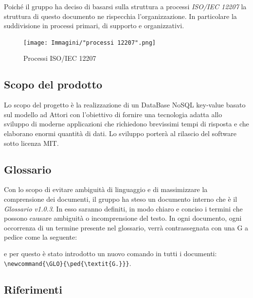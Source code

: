 \documentclass[a4paper]{article}
\begin{document}
			Poiché il gruppo ha deciso di basarsi sulla struttura a processi \emph{ISO/IEC 12207}
			la struttura di questo documento ne rispecchia
			l'organizzazione. In particolare la suddivisione in processi primari, di supporto e organizzativi.
			\begin{figure}[H]
				\centering
				\texttt{[image: Immagini/"processi 12207".png]}
				\caption{Processi ISO/IEC 12207}
			\end{figure}
		\subsection{Scopo del prodotto}
			Lo scopo del progetto è la realizzazione di un DataBase NoSQL key-value basato sul modello ad
			Attori con l'obiettivo di fornire una tecnologia adatta allo sviluppo di moderne
			applicazioni che richiedono brevissimi tempi di risposta e che elaborano enormi quantità
			di dati. Lo sviluppo porterà al rilascio del software sotto licenza MIT.
		\subsection{Glossario}
			Con lo scopo di evitare ambiguità di linguaggio e di massimizzare la comprensione dei documenti, il
	      	gruppo ha steso un documento interno che è il \emph{Glossario v1.0.3}. In esso saranno definiti, in modo
	      	chiaro e conciso i termini che possono causare ambiguità o incomprensione del testo. In ogni documento,
	      	ogni occorrenza di un termine presente nel glossario, verrà contrassegnata con una G a pedice come la seguente:
	      	\newline
	      	\begin{center}
	      	\end{center}
	      	e per questo è stato introdotto un nuovo comando in tutti i documenti: \\
	      	\verb|\newcommand{\GLO}{\ped{\textit{G.}}}|.
		\subsection{Riferimenti}
\end{document}
